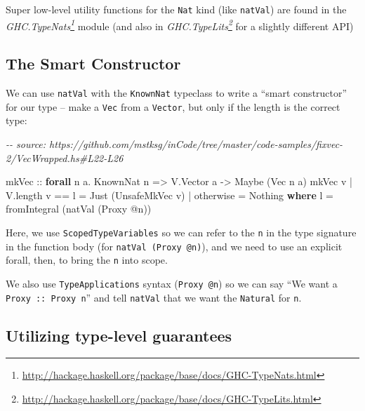 \documentclass[]{article}
\newenvironment{Shaded}{}{}
\newcommand{\CommentTok}[1]{\textcolor[rgb]{0.38,0.63,0.69}{\textit{#1}}}
\newcommand{\DataTypeTok}[1]{\textcolor[rgb]{0.56,0.13,0.00}{#1}}
\newcommand{\FunctionTok}[1]{\textcolor[rgb]{0.02,0.16,0.49}{#1}}
\newcommand{\KeywordTok}[1]{\textcolor[rgb]{0.00,0.44,0.13}{\textbf{#1}}}
\newcommand{\NormalTok}[1]{#1}
\newcommand{\OperatorTok}[1]{\textcolor[rgb]{0.40,0.40,0.40}{#1}}
\newcommand{\OtherTok}[1]{\textcolor[rgb]{0.00,0.44,0.13}{#1}}
\renewcommand{\href}[2]{#2\footnote{\url{#1}}}
\begin{document}
Super low-level utility functions for the \texttt{Nat} kind (like
\texttt{natVal}) are found in the
\emph{\href{http://hackage.haskell.org/package/base/docs/GHC-TypeNats.html}{GHC.TypeNats}}
module (and also in
\emph{\href{http://hackage.haskell.org/package/base/docs/GHC-TypeLits.html}{GHC.TypeLits}}
for a slightly different API)

\subsection{The Smart Constructor}\label{the-smart-constructor}

We can use \texttt{natVal} with the \texttt{KnownNat} typeclass to write a
``smart constructor'' for our type -- make a \texttt{Vec} from a
\texttt{Vector}, but only if the length is the correct type:

\begin{Shaded}
\begin{Highlighting}[]
\CommentTok{{-}{-} source: https://github.com/mstksg/inCode/tree/master/code{-}samples/fixvec{-}2/VecWrapped.hs\#L22{-}L26}

\OtherTok{mkVec ::} \KeywordTok{forall}\NormalTok{ n a}\OperatorTok{.} \DataTypeTok{KnownNat}\NormalTok{ n }\OtherTok{=\textgreater{}} \DataTypeTok{V.Vector}\NormalTok{ a }\OtherTok{{-}\textgreater{}} \DataTypeTok{Maybe}\NormalTok{ (}\DataTypeTok{Vec}\NormalTok{ n a)}
\NormalTok{mkVec v }\OperatorTok{|}\NormalTok{ V.length v }\OperatorTok{==}\NormalTok{ l }\OtherTok{=} \DataTypeTok{Just}\NormalTok{ (}\DataTypeTok{UnsafeMkVec}\NormalTok{ v)}
        \OperatorTok{|} \FunctionTok{otherwise}       \OtherTok{=} \DataTypeTok{Nothing}
  \KeywordTok{where}
\NormalTok{    l }\OtherTok{=} \FunctionTok{fromIntegral}\NormalTok{ (natVal (}\DataTypeTok{Proxy} \OperatorTok{@}\NormalTok{n))}
\end{Highlighting}
\end{Shaded}

Here, we use \texttt{ScopedTypeVariables} so we can refer to the \texttt{n} in
the type signature in the function body (for \texttt{natVal\ (Proxy\ @n)}), and
we need to use an explicit forall, then, to bring the \texttt{n} into scope.

We also use \texttt{TypeApplications} syntax (\texttt{Proxy\ @n}) so we can say
``We want a \texttt{Proxy\ ::\ Proxy\ n}'' and tell \texttt{natVal} that we want
the \texttt{Natural} for \texttt{n}.

\subsection{Utilizing type-level
guarantees}\label{utilizing-type-level-guarantees}
\end{document}
